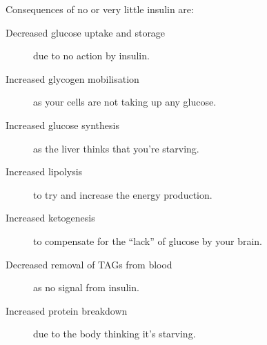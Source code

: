 Consequences of no or very little insulin are:
\begin{description}
\item[Decreased glucose uptake and storage] due to no action by insulin.
\item[Increased glycogen mobilisation] as your cells are not taking up any glucose.
\item[Increased glucose synthesis] as the liver thinks that you're starving.
\item[Increased lipolysis] to try and increase the energy production.
\item[Increased ketogenesis] to compensate for the ``lack'' of glucose by your brain.
\item[Decreased removal of TAGs from blood] as no signal from insulin.
\item[Increased protein breakdown] due to the body thinking it's starving.
\end{description}

\begin{center}
\end{center}

















































